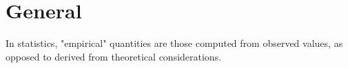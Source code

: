 \documentclass{article}
\begin{document}
\section{General}

In statistics, "empirical" quantities are those computed from observed values, as opposed to derived from theoretical considerations.
\end{document}
